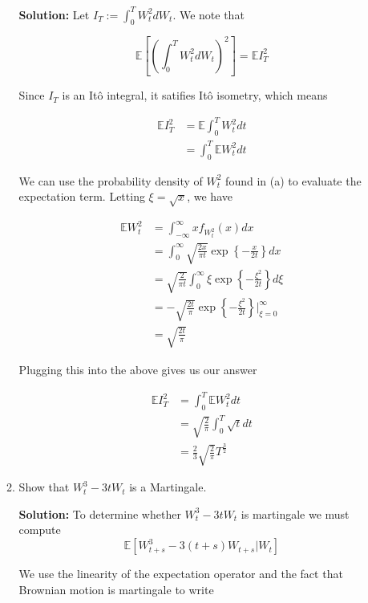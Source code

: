\documentclass[12pt, a4paper]{article}
\begin{document}
\begin{enumerate}
\begin{enumerate}
        \textbf{Solution:} Let $I_T := \int_0^T W_t^2 dW_t$. We note that

        $$\mathbb E \left[ \left( \int_0^T W_t^2 dW_t \right)^2 \right] = \mathbb EI_T^2$$
        
        Since $I_T$ is an Itô integral, it satifies Itô isometry, which means

        \begin{align*}
            \mathbb E I_T^2 &= \mathbb E \int_0^T W_t^2 dt \\
            &= \int_0^T \mathbb E W_t^2 dt
        \end{align*}

        We can use the probability density of $W_t^2$ found in (a) to evaluate the expectation term. Letting $\xi = \sqrt x$, we have 

        \begin{align*}
            \mathbb E W_t^2 &= \int_{-\infty}^\infty x f_{W_t^2}(x) dx \\
            &= \int_0^\infty \sqrt{\frac{2 x}{\pi t}} \exp \left\{ - \frac{x}{2t} \right\}dx \\
            &= \sqrt{\frac{2}{\pi t}} \int_0^\infty  \xi \exp\left\{ - \frac{\xi^2}{2t} \right\}d\xi \\
            &= -\sqrt{\frac{2t}{\pi}} \exp\left\{ - \frac{\xi^2}{2t} \right\} \Bigg|_{\xi=0}^\infty \\
            &= \sqrt{\frac{2t}{\pi}}
        \end{align*}

        Plugging this into the above gives us our answer

        \begin{align*}
            \mathbb E I_T^2 &= \int_0^T \mathbb E W_t^2 dt \\
            &= \sqrt{\frac{2}{\pi}}\int_0^T \sqrt t dt \\
            &= \frac{2}{3}\sqrt{\frac{2}{\pi}} T^{\frac{3}{2}}
        \end{align*}

        \item Show that $W_t^3-3tW_t$ is a Martingale.

        \textbf{Solution:} To determine whether $W_t^3-3tW_t$ is martingale we must compute $$\mathbb E \left[ W_{t+s}^3 - 3(t+s) W_{t+s} \Big| W_t \right]$$ 
        
        We use the linearity of the expectation operator and the fact that Brownian motion is martingale to write


\end{enumerate}
\end{enumerate}
\end{document}
